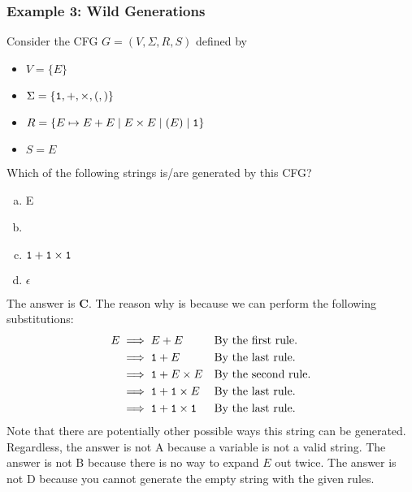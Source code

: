 \documentclass[letterpaper]{article}
\begin{document}
\subsubsection{Example 3: Wild Generations}
Consider the CFG $G = (V, \Sigma, R, S)$ defined by
\begin{itemize}
    \item $V = \{E\}$
    \item $\Sigma = \{\texttt{1}, +, \times, (, )\}$
    \item $R = \{E \mapsto E + E \mid E \times E \mid (E) \mid \texttt{1}\}$
    \item $S = E$
\end{itemize}

Which of the following strings is/are generated by this CFG?
\begin{enumerate}[a.]
    \item E
    \item {}
    \item $\texttt{1} + \texttt{1} \times \texttt{1}$
    \item $\epsilon$
\end{enumerate}

\begin{mdframed}[]
    The answer is \textbf{C}. The reason why is because we can perform the following substitutions:
    \begin{equation*}
        \begin{aligned}
            E &\implies E + E && \text{By the first rule.} \\ 
                &\implies \texttt{1} + E && \text{By the last rule.} \\ 
                &\implies \texttt{1} + E \times E && \text{By the second rule.} \\ 
                &\implies \texttt{1} + \texttt{1} \times E && \text{By the last rule.} \\ 
                &\implies \texttt{1} + \texttt{1} \times \texttt{1} && \text{By the last rule.}
        \end{aligned}
    \end{equation*}
    Note that there are potentially other possible ways this string can be generated. Regardless, the answer is not A because a variable is not a valid string. The answer is not B because there is no way to expand $E$ out twice. The answer is not D because you cannot generate the empty string with the given rules. 
\end{mdframed}
\end{document}
